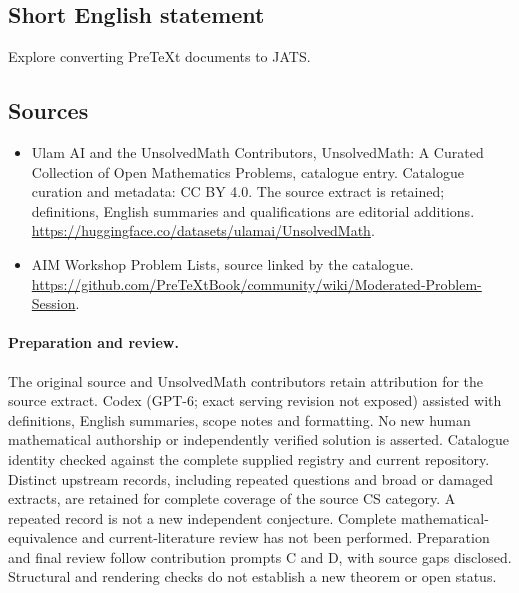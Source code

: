 \documentclass[11pt]{article}
\begin{document}
\subsection{Short English statement}
Explore converting PreTeXt documents to JATS.
\subsection{Sources}
\begin{itemize}
\item[\hypertarget{source:statement:1}{S1}] Ulam AI and the UnsolvedMath Contributors, UnsolvedMath: A Curated Collection of Open Mathematics Problems, catalogue entry. Catalogue curation and metadata: CC BY 4.0. The source extract is retained; definitions, English summaries and qualifications are editorial additions.
\url{https://huggingface.co/datasets/ulamai/UnsolvedMath}.
\item[\hypertarget{source:statement:2}{S2}] AIM Workshop Problem Lists, source linked by the catalogue.
\url{https://github.com/PreTeXtBook/community/wiki/Moderated-Problem-Session}.
\end{itemize}
\paragraph{Preparation and review.}
The original source and UnsolvedMath contributors retain attribution for the source extract. Codex (GPT-6; exact serving revision not exposed) assisted with definitions, English summaries, scope notes and formatting. No new human mathematical authorship or independently verified solution is asserted. Catalogue identity checked against the complete supplied registry and current repository. Distinct upstream records, including repeated questions and broad or damaged extracts, are retained for complete coverage of the source CS category. A repeated record is not a new independent conjecture. Complete mathematical-equivalence and current-literature review has not been performed. Preparation and final review follow contribution prompts C and D, with source gaps disclosed. Structural and rendering checks do not establish a new theorem or open status.
\label{end:statement}
\end{document}
